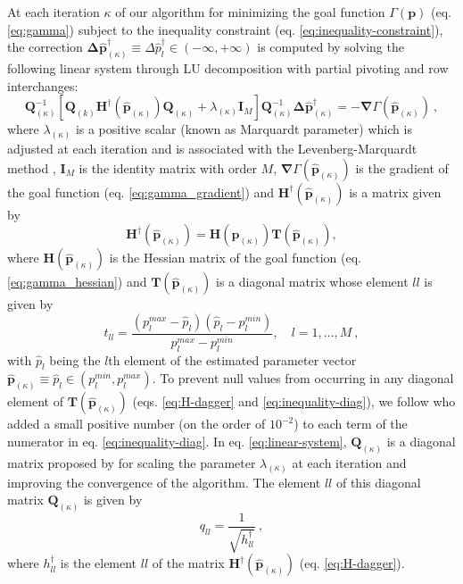At each iteration $\kappa$ of our algorithm for minimizing the goal function $\Gamma(\mathbf{p})$ (eq. \ref{eq:gamma}) subject to the inequality constraint
(eq. \ref{eq:inequality-constraint}), the correction 
$\boldsymbol{\Delta}\hat{\mathbf{p}}^{\dagger}_{(\kappa)} \equiv 
\Delta \hat{p}^{\dagger}_{l} \in (- \infty, + \infty)$ 
is computed by solving the following linear system through LU decomposition with partial pivoting and row interchanges:
\begin{equation}\label{eq:linear-system}
\mathbf{Q}_{(\kappa)}^{-1} \left[\mathbf{Q}_{(k)} \mathbf{H}^{\dagger}(\hat{\mathbf{p}}_{(\kappa)}) \mathbf{Q}_{(\kappa)} + \lambda_{(\kappa)} \mathbf{I}_{M} \right] 
\mathbf{Q}_{(\kappa)}^{-1} \boldsymbol{\Delta} \hat{\mathbf{p}}^{\dagger}_{(\kappa)} 
= -\boldsymbol{\nabla}\Gamma(\hat{\mathbf{p}}_{(\kappa)}) \: ,
\end{equation}
where $\lambda_{(\kappa)}$ is a positive scalar (known as Marquardt parameter) which is adjusted at each iteration and is associated with the Levenberg-Marquardt method \cite[e.g., ][ p. 240]{silva-2001,aster-etal2019},
$\mathbf{I}_{M}$ is the identity matrix with order $M$, 
$\boldsymbol{\nabla}\Gamma(\hat{\mathbf{p}}_{(\kappa)})$
is the gradient of the goal function (eq. \ref{eq:gamma_gradient}) and 
$\mathbf{H}^{\dagger}(\hat{\mathbf{p}}_{(\kappa)})$ is a matrix given by
\begin{equation}\label{eq:H-dagger}
\mathbf{H}^{\dagger}(\hat{\mathbf{p}}_{(\kappa)}) = \mathbf{H}(\hat{\mathbf{p}}_{(\kappa)})\mathbf{T}(\hat{\mathbf{p}}_{(\kappa)}),
\end{equation}
where $\mathbf{H}(\hat{\mathbf{p}}_{(\kappa)})$ is the Hessian matrix of the goal function (eq. \ref{eq:gamma_hessian}) and $\mathbf{T}(\hat{\mathbf{p}}_{(\kappa)})$ is a diagonal matrix whose element $ll$ is given by
\begin{equation}\label{eq:inequality-diag}
t_{ll} = \frac{(p_{l}^{max} - \hat{p}_{l})(\hat{p}_{l} - p_{l}^{min})}{p_{l}^{max} - p_{l}^{min}}, \quad l = 1, \dots, M \: ,
\end{equation}
with $\hat{p}_{l}$ being the $l$th element of the estimated parameter vector 
$\hat{\mathbf{p}}_{(\kappa)} \equiv \hat{p}_{l} \in (p_{l}^{min}, p_{l}^{max})$. 
To prevent null values from occurring in any diagonal element of 
$\mathbf{T}(\hat{\mathbf{p}}_{(\kappa)})$ 
(eqs. \ref{eq:H-dagger} and \ref{eq:inequality-diag}), 
we follow \cite{barbosa-1999b} who added a small positive number (on the order of $10^{-2}$) 
to each term of the numerator in eq. \ref{eq:inequality-diag}.
In eq. \ref{eq:linear-system}, $\mathbf{Q}_{(\kappa)}$ is a diagonal matrix proposed by \cite{marquardt_algorithm_1963} for scaling the parameter $\lambda_{(\kappa)}$ at each iteration and improving the convergence of the algorithm. 
The element $ll$ of this diagonal matrix $\mathbf{Q}_{(\kappa)}$ is given by
\begin{equation}\label{eq:Q-matrix}
q_{ll} = \frac{1}{\sqrt{h^{\dagger}_{ll}}} \: ,
\end{equation}
where $h^{\dagger}_{ll}$ is the element $ll$ of the matrix $\mathbf{H}^{\dagger}(\hat{\mathbf{p}}_{(\kappa)})$ (eq. \ref{eq:H-dagger}). 


